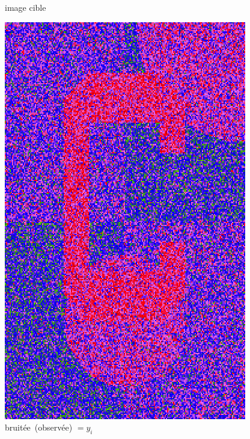 \documentclass[12pt]{beamer}
\begin{document}
\begin{frame}
\begin{center}
\begin{minipage}[t]{0.2\textwidth}
{\small image cible}
\end{minipage}
\hfill
\begin{minipage}[t]{0.2\textwidth}
\includegraphics[width=\textwidth]{c_noisy.png} \\
{\small \mbox{bruitée (observée)} $= y_i$}
\end{minipage}
\hfill
\begin{minipage}[t]{0.2\textwidth}

\end{minipage}
\end{center}
\end{frame}
\end{document}
